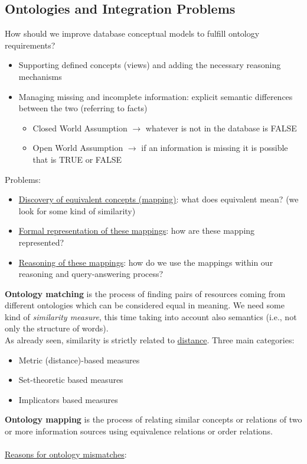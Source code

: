 \documentclass[10pt,a4paper]{article}
\newcommand{\nline}{\\~\\}
\begin{document}
\subsection{Ontologies and Integration Problems}
How should we improve database conceptual models to fulfill ontology requirements?
\begin{itemize}
	\item Supporting defined concepts (views) and adding the necessary reasoning mechanisms
	\item Managing missing and incomplete information: explicit semantic differences between the two (referring to facts)
	\begin{itemize}
		\item Closed World Assumption $\rightarrow$ whatever is not in the database is FALSE
		\item Open World Assumption $\rightarrow$ if an information is missing it is possible that is TRUE or FALSE
	\end{itemize}
\end{itemize}
Problems:
\begin{itemize}
	\item \uline{Discovery of equivalent concepts (mapping)}: what does equivalent mean? (we look for some kind of similarity)
	\item \uline{Formal representation of these mappings}: how are these mapping represented?
	\item \uline{Reasoning of these mappings}: how do we use the mappings within our reasoning and query-answering process?
\end{itemize}
\textbf{Ontology matching} is the process of finding pairs of resources coming from different ontologies which can be considered equal in meaning. We need some kind of \textit{similarity measure}, this time taking into account also semantics (i.e., not only the structure of words). \\
As already seen, similarity is strictly related to \uline{distance}. 
Three main categories:
\begin{itemize}
	\item Metric (distance)-based measures
	\item Set-theoretic based measures
	\item Implicators based measures
\end{itemize}
\textbf{Ontology mapping} is the process of relating similar concepts or relations of two or more information sources using equivalence relations or order relations.
\nline
\uline{Reasons for ontology mismatches}:
\end{document}
